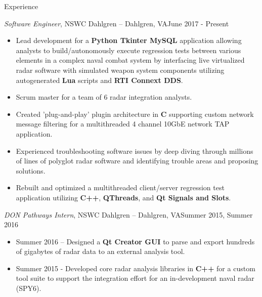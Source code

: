 \documentclass[calibri]{mcdowellcv}
\begin{document}
	\makeheader
	
	\begin{cvsection}{Experience}
		\begin{cvsubsection}{\textit{Software Engineer}, NSWC Dahlgren -- Dahlgren, VA}{June 2017 - Present}
			\begin{itemize}
				\item Lead development for a \textbf{Python Tkinter MySQL} application allowing analysts to build/autonomously execute regression tests between various elements in a complex naval combat system by interfacing live virtualized radar software with simulated weapon system components utilizing autogenerated \textbf{Lua} scripts and \textbf{RTI Connext DDS}. 
				\item Scrum master for a team of 6 radar integration analysts.
				\item Created 'plug-and-play' plugin architecture in \textbf{C} supporting custom network message filtering for a multithreaded 4 channel 10GbE network TAP application.  
				\item Experienced troubleshooting software issues by deep diving through millions of lines of polyglot radar software and identifying trouble areas and proposing solutions.  
				\item Rebuilt and optimized a multithreaded client/server regression test application utilizing \textbf{C++}, \textbf{QThreads}, and \textbf{Qt Signals and Slots}.   
			\end{itemize}
		\end{cvsubsection}
		
		\begin{cvsubsection}{\textit{DON Pathways Intern}, NSWC Dahlgren -- Dahlgren, VA}{Summer 2015, Summer 2016}	
			\begin{itemize}
				\item Summer 2016 -- Designed a \textbf{Qt Creator GUI} to parse and export hundreds of gigabytes of radar data to an external analysis tool.  
				\item Summer 2015 - Developed core radar analysis libraries in \textbf{C++} for a custom tool suite to support the integration effort for an in-development naval radar (SPY6).  
			\end{itemize}
		\end{cvsubsection}
	\end{cvsection}
	
\end{document}

